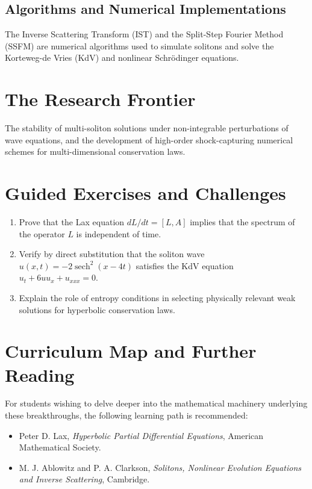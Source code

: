 \subsection{Algorithms and Numerical Implementations}
The Inverse Scattering Transform (IST) and the Split-Step Fourier Method (SSFM) are numerical algorithms used to simulate solitons and solve the Korteweg-de Vries (KdV) and nonlinear Schr\"odinger equations.

\section{The Research Frontier}
The stability of multi-soliton solutions under non-integrable perturbations of wave equations, and the development of high-order shock-capturing numerical schemes for multi-dimensional conservation laws.

\section{Guided Exercises and Challenges}
\begin{enumerate}[label=\textbf{\arabic*.}]
  \item Prove that the Lax equation $dL/dt = [L, A]$ implies that the spectrum of the operator $L$ is independent of time.
  \item Verify by direct substitution that the soliton wave $u(x,t) = -2 \operatorname{sech}^2(x - 4t)$ satisfies the KdV equation $u_t + 6uu_x + u_{xxx} = 0$.
  \item Explain the role of entropy conditions in selecting physically relevant weak solutions for hyperbolic conservation laws.
\end{enumerate}

\section{Curriculum Map and Further Reading}
For students wishing to delve deeper into the mathematical machinery underlying these breakthroughs, the following learning path is recommended:
\begin{itemize}
  \item Peter D. Lax, \emph{Hyperbolic Partial Differential Equations}, American Mathematical Society.
  \item M. J. Ablowitz and P. A. Clarkson, \emph{Solitons, Nonlinear Evolution Equations and Inverse Scattering}, Cambridge.
\end{itemize}

